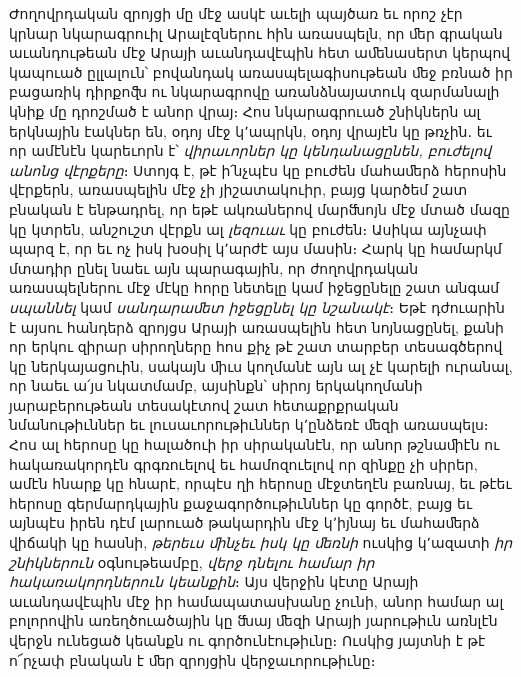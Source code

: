 \documentclass{article}
\begin{document}
{Ժողովրդական զրոյցի մը մէջ ասկէ աւելի պայծառ եւ որոշ չէր կրնար նկարագրուիլ Արալէզներու հին առասպելն, որ ﬔր գրական աւանդութեան մէջ Արայի աւանդավէպին հետ աﬔնասերտ կերպով կապուած ըլլալուն՝ բովանդակ առասպելագիսութեան ﬔջ բռնած իր բացառիկ դիրքոﬖ ու նկարագրովը առանձնայատուկ զարմանալի կնիք մը դրոշմած է անոր վրայ։ Հոս նկարագրուած շնիկներն ալ երկնային էակներ են, օդոյ մէջ կ՚ապրկն, օդոյ վրայէն կը թռչին․ եւ որ ամէնէն կարեւորն է՝ \emph{վիրաւորներ կը կենդանացընեն, բուժելով անոնց վէրքերը}։ Ստոյգ է, թէ ի՛նչպէս կը բուժեն մահաﬔրձ հերոսին վէրքերն, առասպելին մէջ չի յիշատակուիր, բայց կարծեմ շատ բնական է ենթադրել, որ եթէ ակռաներով մարﬓոյն մէջ մտած մազը կը կտրեն, անշուշտ վէրքն ալ \emph{լեզուաւ} կը բուժեն։ Ասիկա այնչափ պարզ է, որ եւ ոչ իսկ խօսիլ կ՚արժէ այս մասին։ Հարկ կը համարկմ մտադիր ընել նաեւ այն պարագային, որ ժողովրդական առասպելներու մէջ մէկը հորը նետելը կամ իջեցընելը շատ անգամ \emph{սպաննել} կամ \emph{սանդարաﬔտ իջեցընել կը նշանակէ}։ Եթէ դժուարին է այսու հանդերձ զրոյցս Արայի առասպելին հետ նոյնացընել, քանի որ երկու զիրար սիրողները հոս քիչ թէ շատ տարբեր տեսագծերով կը ներկայացուին, սակայն ﬕւս կողմանէ այն ալ չէ կարելի ուրանալ, որ նաեւ ա՛յս նկատմամբ, այսինքն՝ սիրոյ երկակողմանի յարաբերութեան տեսակէտով շատ հետաքրքրական նմանութիւններ եւ լուսաւորութիւններ կ՚ընձեռէ ﬔզի առասպելս։ Հոս ալ հերոսը կը հալածուի իր սիրականէն, որ անոր թշնաﬕէն ու հակառակորդէն գրգռուելով եւ համոզուելով որ զինքը չի սիրեր, ամէն հնարք կը հնարէ, որպէս ղի հերոսը մէջտեղէն բառնայ, եւ թէեւ հերոսը գերմարդկային քաջագործութիւններ կը գործէ, բայց եւ այնպէս իրեն դէմ լարուած թակարդին մէջ կ՚իյնայ եւ մահաﬔրձ վիճակի կը հասնի, \emph{թերեւս ﬕնչեւ իսկ կը ﬔռնի} ուսկից կ՚ազատի \emph{իր շնիկներուն} օգնութեամբը, \emph{վերջ դնելու համար իր հակառակորդներուն կեանքին}։ Այս վերջին կէտը Արայի աւանդավէպին մէջ իր համապատասխանը չունի, անոր համար ալ բոլորովին առեղծուածային կը ﬓայ ﬔզի Արայի յարութիւն առնլէն վերջն ունեցած կեանքն ու գործունէութիւնը։ Ուսկից յայտնի է թէ ո՜րչափ բնական է ﬔր զրոյցին վերջաւորութիւնը։

}
\end{document}
